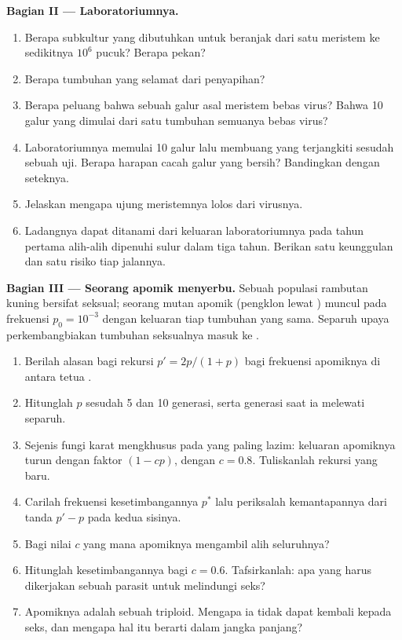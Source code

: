\begin{problem}
\medskip
\noindent\textbf{Bagian II --- Laboratoriumnya.}
\begin{enumerate}[resume]
  \item Berapa subkultur yang dibutuhkan untuk beranjak dari satu
        meristem ke sedikitnya $10^{6}$ pucuk? Berapa pekan?
  \item Berapa tumbuhan yang selamat dari penyapihan?
  \item Berapa peluang bahwa sebuah galur asal meristem bebas virus?
        Bahwa \num{10} galur yang dimulai dari satu tumbuhan semuanya
        bebas virus?
  \item Laboratoriumnya memulai \num{10} galur lalu membuang yang
        terjangkiti sesudah sebuah uji. Berapa harapan cacah galur yang
        bersih? Bandingkan dengan seteknya.
  \item Jelaskan mengapa ujung meristemnya lolos dari virusnya.
  \item Ladangnya dapat ditanami dari keluaran laboratoriumnya pada
        tahun pertama alih-alih dipenuhi sulur dalam tiga tahun.
        Berikan satu keunggulan dan satu risiko tiap jalannya.
\end{enumerate}

\medskip
\noindent\textbf{Bagian III --- Seorang apomik menyerbu.}
Sebuah populasi rambutan kuning bersifat seksual; seorang mutan apomik
(pengklon lewat ) muncul pada frekuensi $p_0 = 10^{-3}$ dengan
keluaran  tiap tumbuhan yang sama. Separuh upaya perkembangbiakan
tumbuhan seksualnya masuk ke .
\begin{enumerate}[resume]
  \item Berilah alasan bagi rekursi $p' = 2p/(1 + p)$ bagi frekuensi
        apomiknya di antara tetua .
  \item Hitunglah $p$ sesudah 5 dan 10 generasi, serta generasi saat ia
        melewati separuh.
  \item Sejenis fungi karat mengkhusus pada  yang paling lazim:
        keluaran  apomiknya turun dengan faktor $(1 - cp)$, dengan
        $c = 0.8$. Tuliskanlah rekursi yang baru.
  \item Carilah frekuensi kesetimbangannya $p^*$ lalu periksalah
        kemantapannya dari tanda $p' - p$ pada kedua sisinya.
  \item Bagi nilai $c$ yang mana apomiknya mengambil alih seluruhnya?
  \item Hitunglah kesetimbangannya bagi $c = 0.6$. Tafsirkanlah: apa
        yang harus dikerjakan sebuah parasit untuk melindungi seks?
  \item Apomiknya adalah sebuah triploid. Mengapa ia tidak dapat
        kembali kepada seks, dan mengapa hal itu berarti dalam jangka
        panjang?
\end{enumerate}


\end{problem}

